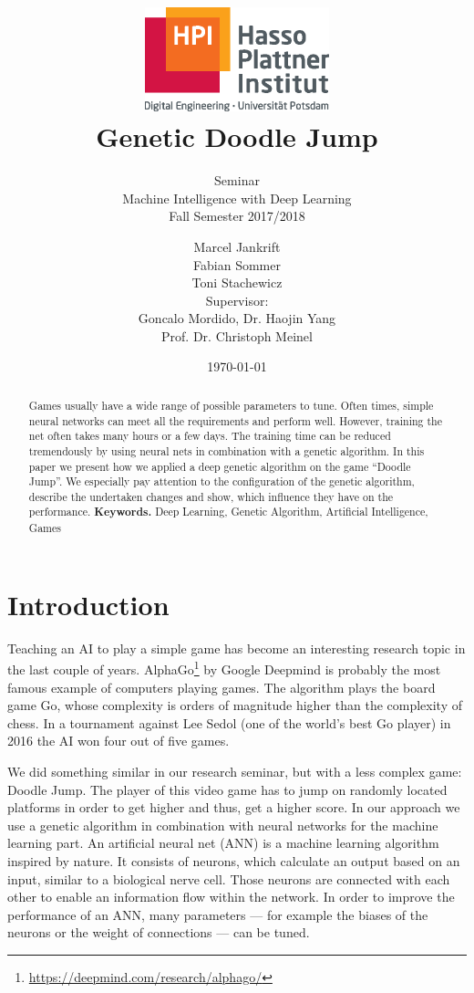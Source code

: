 \documentclass[a4paper,12pt,pagesize,headsepline,bibtotoc,titlepage,abstracton]{scrartcl}
\title{
	\includegraphics*[width=0.4\textwidth]{hpi_logo_2017.eps}\\
	\vspace{24pt}
	Genetic Doodle Jump
}
\subtitle{
	Seminar\\
	Machine Intelligence with Deep Learning\\
	Fall Semester 2017/2018
}
\author{
	Marcel Jankrift\\
	Fabian Sommer\\
	Toni Stachewicz\\[12pt]
	Supervisor:\\
	Goncalo Mordido,
	Dr. Haojin Yang\\
	Prof. Dr. Christoph Meinel
}
\date{\today}
\newcommand{\quot}[1]{{``#1''}}
\begin{document}
\maketitle
\tableofcontents

\newpage

\begin{abstract}
Games usually have a wide range of possible parameters to tune. Often times, simple neural networks can meet all the requirements and perform well. However, training the net often takes many hours or a few days. The training time can be reduced tremendously by using neural nets in combination with a genetic algorithm. In this paper we present how we applied a deep genetic algorithm on the game \quot{Doodle Jump}. We especially pay attention to the configuration of the genetic algorithm, describe the undertaken changes and show, which influence they have on the performance.
\vskip 0.7cm
\noindent \textbf{Keywords.} Deep Learning, Genetic Algorithm, Artificial Intelligence, Games
\end{abstract}
\newpage

\section{Introduction}
Teaching an AI to play a simple game has become an interesting research topic in the last couple of years. AlphaGo\footnote{\url{https://deepmind.com/research/alphago/}} by Google Deepmind is probably the most famous example of computers playing games. The algorithm plays the board game Go, whose complexity is orders of magnitude higher than the complexity of chess. In a tournament against Lee Sedol (one of the world's best Go player) in 2016 the AI won four out of five games.

We did something similar in our research seminar, but with a less complex game: Doodle Jump. The player of this video game has to jump on randomly located platforms in order to get higher and thus, get a higher score. In our approach we use a genetic algorithm in combination with neural networks for the machine learning part. An artificial neural net (ANN) is a machine learning algorithm inspired by nature. It consists of neurons, which calculate an output based on an input, similar to a biological nerve cell. Those neurons are connected with each other to enable an information flow within the network. In order to improve the performance of an ANN, many parameters --- for example the biases of the neurons or the weight of connections --- can be tuned.
\end{document}
